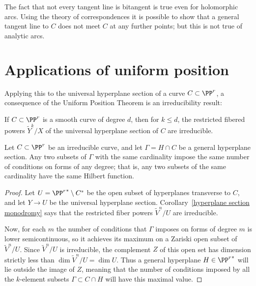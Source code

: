 \begin{remark}
 The fact that not every tangent line is bitangent is true
even for holomorphic arcs. Using the theory of correspondences it is possible to show that
a general tangent line to $C$ does not meet $C$ at any further points; but
this is not true of analytic arcs.
\end{remark}

 \section{Applications of uniform position}

Applying this to the universal hyperplane section of a curve $C \subset \PP^r$, a consequence of the Uniform Position Theorem is an irreducibility result:

\begin{corollary}\label{hyperplane section monodromy} If $C\subset \PP^r$ is a smooth curve of degree $d$, then 
for $k\leq d$, the restricted fibered powers $\tilde Y^k/X$  of the universal hyperplane section 
of $C$ are irreducible.
\end{corollary}


\begin{corollary}\label{numerical uniform position lemma}
Let $C\subset \PP^r$ be an irreducible curve, and let $\Gamma = H\cap C$ be a general hyperplane section. Any two subsets of $\Gamma$ with the same cardinality impose the same number of conditions on forms of any degree; that is, any two subsets of the same cardinality have the same Hilbert function.
\end{corollary}

\begin{proof} Let $U = {\PP^r}^* \setminus C^*$ be the open subset of hyperplanes transverse to $C$, and let $Y\to U$ be the universal hyperplane section.
Corollary~\ref{hyperplane section monodromy} says that the restricted fiber powers $\tilde V^n/U$ are irreducible.

Now, for each $m$ the number of conditions that $\Gamma$ imposes on forms of degree $m$ is lower semicontinuous, so it achieves its maximum on a Zariski open subset of $\tilde V^n/U$. Since $\tilde V^n/U$ is irreducible, the complement $Z$ of this open set has dimension strictly less than $\dim \tilde V^n/U = \dim U$. Thus a general hyperplane $H \in {\PP^r}^*$ will lie outside the image of $Z$, meaning that the number of conditions imposed by all the $k$-element subsets $\Gamma \subset C \cap H$ will have this maximal value.
\end{proof}

